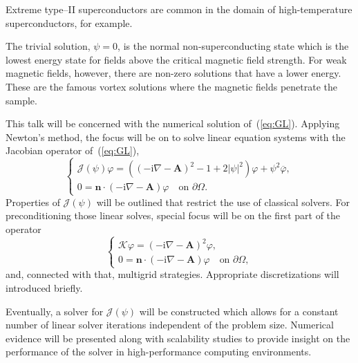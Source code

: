 \documentclass{report}
\begin{document}
Extreme type--II superconductors are common in the domain of high-tem\-per\-a\-ture
superconductors, for example.

The trivial solution, $\psi=0$, is the normal non-superconducting
state which is the lowest energy state for fields above the critical
magnetic field strength. For weak magnetic fields, however, there are
non-zero solutions that have a lower energy. These are the famous vortex
solutions where the magnetic fields penetrate the sample.

This talk will be concerned with the numerical solution of~(\ref{eq:GL}). Applying
Newton's method, the focus will be on to solve linear equation systems with the
Jacobian operator of~(\ref{eq:GL}),
\begin{equation}\label{eq:jacobian}
\begin{cases}
\mathcal{J}(\psi)\varphi = \left( (-\text{i} \nabla - \mathbf{A})^2 - 1 +
2|\psi|^2 \right) \varphi + \psi^2 \overline{\varphi},\\
0 = \mathbf{n} \cdot ( -\text{i}\nabla - \mathbf{A}) \varphi \quad
\text{on } \partial\Omega.
\end{cases}
\end{equation}
Properties of $\mathcal{J}(\psi)$ will be outlined that restrict the use
of classical solvers.
For preconditioning those linear solves, special focus will be on the
first part of the operator
\begin{equation}\label{eq:keo}
\begin{cases}
\mathcal{K}\varphi = (-\text{i} \nabla - \mathbf{A})^2 \varphi,\\
0 = \mathbf{n} \cdot ( -\text{i}\nabla - \mathbf{A}) \varphi \quad
\text{on } \partial\Omega,
\end{cases}
\end{equation}
and, connected with that, multigrid strategies. Appropriate discretizations will
introduced briefly.

Eventually, a solver for $\mathcal{J}(\psi)$ will be constructed which allows
for a constant number of linear solver iterations independent of the problem size.
Numerical evidence will be presented along with scalability studies to provide
insight on the performance of the solver in high-performance computing environments.
\end{document}
